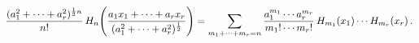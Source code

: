 \[\frac{(a_{1}^{2}+\dots+a_{r}^{2})^{\frac{1}{2}n}}{n!}\mathop{H_{n}\/}\nolimits%
\!\left(\frac{a_{1}x_{1}+\cdots+a_{r}x_{r}}{(a_{1}^{2}+\cdots+a_{r}^{2})^{%
\frac{1}{2}}}\right)=\sum_{m_{1}+\cdots+m_{r}=n}\frac{a_{1}^{m_{1}}\cdots a_{r%
}^{m_{r}}}{m_{1}!\cdots m_{r}!}\mathop{H_{m_{1}}\/}\nolimits\!\left(x_{1}%
\right)\cdots\mathop{H_{m_{r}}\/}\nolimits\!\left(x_{r}\right).\]